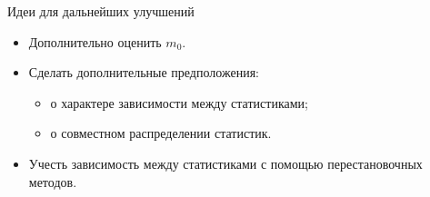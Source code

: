 \documentclass[9pt,pdf,utf8,hyperref={unicode},aspectratio=169]{beamer}
\begin{document}
\begin{frame}{Идеи для дальнейших улучшений}
    \begin{itemize}
    \item Дополнительно оценить $m_0$.
    \bigskip
    \item Сделать дополнительные предположения:
        \begin{itemize}
        \item о характере зависимости между статистиками;
        \item о совместном распределении статистик.
    \bigskip
        \end{itemize}
    \bigskip
    \item Учесть зависимость между статистиками с помощью перестановочных методов.
    \end{itemize}
\end{frame}
\end{document}
